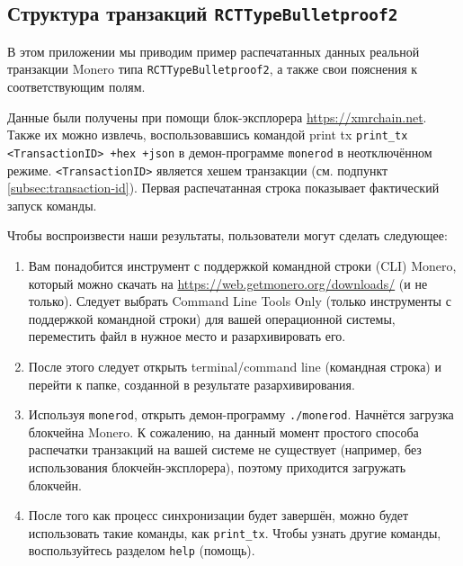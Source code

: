 \begin{appendices}

\renewcommand{\theFancyVerbLine}{%
	\textcolor{red}{\small
		\arabic{FancyVerbLine}}}

\chapter{Структура транзакций {\tt RCTTypeBulletproof2}}
\label{appendix:RCTTypeBulletproof2}

В этом приложении мы приводим пример распечатанных данных реальной транзакции Monero типа {\tt RCTTypeBulletproof2}, а также свои пояснения к соответствующим полям.

Данные были получены при помощи блок-эксплорера \url{https://xmrchain.net}. Также их мож\-но извлечь, воспользовавшись командой print tx {\tt print\_tx <TransactionID> +hex +json} в демон-программе {\tt monerod} в неотключённом режиме. {\tt <TransactionID>} является хешем тран\-закции (см. подпункт \ref{subsec:transaction-id}). Первая распечатанная строка показывает фактический запуск команды.%

Чтобы воспроизвести наши результаты, пользователи могут сделать следующее:%
\begin{enumerate}
    \item Вам понадобится инструмент с поддержкой командной строки (CLI) Monero, который можно скачать на \url{https://web.getmonero.org/downloads/} (и не только). Следует вы\-брать Command Line Tools Only (только инструменты с поддержкой командной строки) для вашей операционной системы, переместить файл в нужное место и разархивировать его.
    \item После этого следует открыть terminal/command line (командная строка) и перейти к папке, созданной в результате разархивирования.
    \item Используя {\tt monerod}, открыть демон-программу {\tt ./monerod}. Начнётся загрузка блокчейна Monero. К сожалению, на данный момент простого способа распечатки транзакций на вашей системе не существует (например, без использования блокчейн-эксплорера), поэтому приходится загружать блокчейн.
    \item После того как процесс синхронизации будет завершён, можно будет использовать такие команды, как {\tt print\_tx}. Чтобы узнать другие команды, воспользуйтесь разделом {\tt help} (помощь).
\end{enumerate}


\end{appendices}
